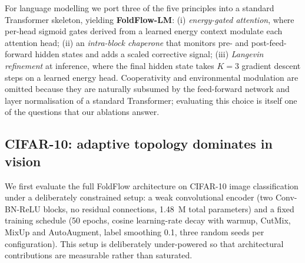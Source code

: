 \documentclass[fleqn,10pt]{article}
\begin{document}
For language modelling we port three of the five principles into a
standard Transformer skeleton,\cite{vaswani2017attention} yielding
\textbf{FoldFlow-LM}: (i) \emph{energy-gated attention}, where per-head
sigmoid gates derived from a learned energy context modulate each
attention head; (ii) an \emph{intra-block chaperone} that monitors
pre- and post-feed-forward hidden states and adds a scaled corrective
signal; (iii) \emph{Langevin refinement} at inference, where the
final hidden state takes $K{=}3$ gradient descent steps on a learned
energy head. Cooperativity and environmental modulation are omitted
because they are naturally subsumed by the feed-forward network and
layer normalisation of a standard Transformer; evaluating this choice
is itself one of the questions that our ablations answer.

\subsection*{CIFAR-10: adaptive topology dominates in vision}

We first evaluate the full FoldFlow architecture on CIFAR-10 image
classification\cite{krizhevsky2009cifar} under a deliberately
constrained setup: a weak convolutional encoder (two Conv-BN-ReLU
blocks, no residual connections, 1.48~M total parameters) and a
fixed training schedule (50 epochs, cosine learning-rate decay with
warmup, CutMix,\cite{yun2019cutmix}
MixUp\cite{zhang2018mixup} and AutoAugment,\cite{cubuk2020randaugment}
label smoothing 0.1, three random seeds per configuration). This
setup is deliberately under-powered so that architectural
contributions are measurable rather than saturated.
\end{document}
